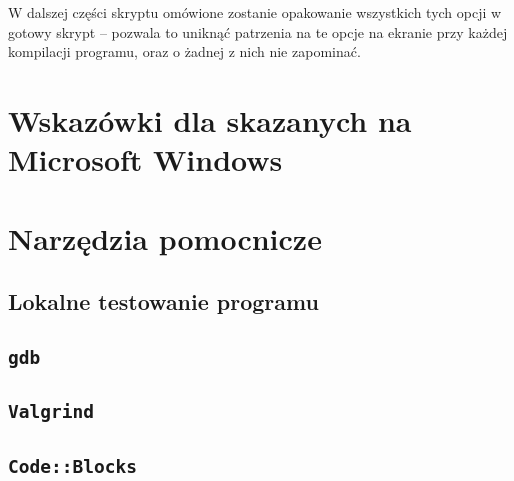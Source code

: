 W dalszej części skryptu omówione zostanie opakowanie wszystkich tych opcji
w gotowy skrypt -- pozwala to uniknąć patrzenia na te opcje na ekranie przy
każdej kompilacji programu, oraz o żadnej z nich nie zapominać.

\section{Wskazówki dla skazanych na Microsoft Windows}

\section{Narzędzia pomocnicze}

\subsection{Lokalne testowanie programu}

\subsection{\texttt{gdb}}\label{subsec:gdb}

\subsection{\texttt{Valgrind}}

\subsection{\texttt{Code::Blocks}}
